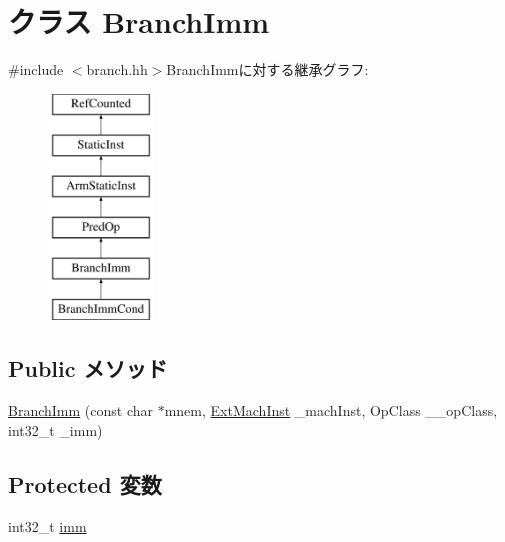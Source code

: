 \hypertarget{classArmISA_1_1BranchImm}{
\section{クラス BranchImm}
\label{classArmISA_1_1BranchImm}
}


{\ttfamily \#include $<$branch.hh$>$}BranchImmに対する継承グラフ:\begin{figure}[H]
\begin{center}
\leavevmode
\includegraphics[height=6cm]{classArmISA_1_1BranchImm}
\end{center}
\end{figure}
\subsection*{Public メソッド}
\begin{DoxyCompactItemize}
\item 
\hyperlink{classArmISA_1_1BranchImm_ab6a71217a0ddc2ec12888c65d478c13b}{BranchImm} (const char $\ast$mnem, \hyperlink{classStaticInst_a5605d4fc727eae9e595325c90c0ec108}{ExtMachInst} \_\-machInst, OpClass \_\-\_\-opClass, int32\_\-t \_\-imm)
\end{DoxyCompactItemize}
\subsection*{Protected 変数}
\begin{DoxyCompactItemize}
\item 
int32\_\-t \hyperlink{classArmISA_1_1BranchImm_a71f011dbd3228d41f9e08aaf8c133f77}{imm}
\end{DoxyCompactItemize}


